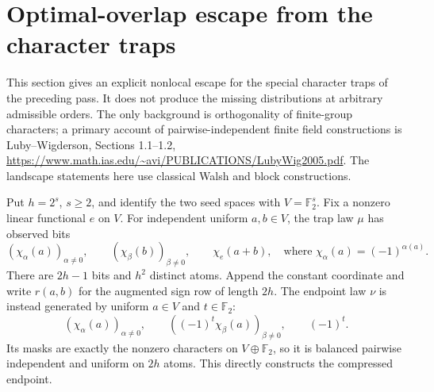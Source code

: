 \section{Optimal-overlap escape from the character traps}
\label{s15:sec:compression-escape}
This section gives an explicit nonlocal escape for the special character
traps of the preceding pass. It does not produce the missing distributions
at arbitrary admissible orders. The only background is orthogonality of
finite-group characters; a primary account of pairwise-independent finite
field constructions is Luby--Wigderson, Sections 1.1--1.2,
\url{https://www.math.ias.edu/~avi/PUBLICATIONS/LubyWig2005.pdf}.
The landscape statements here use classical Walsh and block constructions.

Put $h=2^s$, $s\ge2$, and identify the two seed spaces with
$V=\mathbb F_2^s$. Fix a nonzero linear functional $e$ on $V$.
For independent uniform $a,b\in V$, the trap law $\mu$ has observed bits
\[
 (\chi_\alpha(a))_{\alpha\ne0},\qquad
 (\chi_\beta(b))_{\beta\ne0},\qquad
 \chi_e(a+b),
 \quad\text{where }\chi_\alpha(a)=(-1)^{\alpha(a)}.
\]
There are $2h-1$ bits and $h^2$ distinct atoms. Append the constant
coordinate and write $r(a,b)$ for the augmented sign row of length $2h$.
The endpoint law $\nu$ is instead generated by uniform $a\in V$ and
$t\in\mathbb F_2$:
\begin{equation}\label{s15:eq:compression-endpoint}
 (\chi_\alpha(a))_{\alpha\ne0},\qquad
 ((-1)^t\chi_\beta(a))_{\beta\ne0},\qquad (-1)^t.
\end{equation}
Its masks are exactly the nonzero characters on $V\oplus\mathbb F_2$,
so it is balanced pairwise independent and uniform on $2h$ atoms.
This directly constructs the compressed endpoint.

